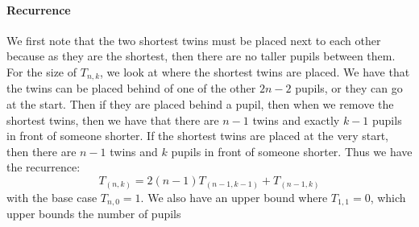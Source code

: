 \documentclass[]{article}
\begin{document}
\paragraph{Recurrence}
We first note that the two shortest twins must be placed next to each other because as they are the shortest, then there are no taller pupils between them. 
For the size of $T_{n, k}$, we look at where the shortest twins are placed. We have that the twins can be placed behind of one of the other $2n - 2$ pupils, or they can go at the start. Then if they are placed behind a pupil, then when we remove the shortest twins, then we have that there are $n-1$ twins and exactly $k-1$ pupils in front of someone shorter. If the shortest twins are placed at the very start, then there are $n-1$ twins and $k$ pupils in front of someone shorter. Thus we have the recurrence:
\begin{equation}
	T_{(n, k)} = 2(n-1) T_{(n-1, k-1)} + T_{(n-1, k)}
\end{equation}
with the base case $T_{n, 0} = 1$. We also have an upper bound where $T_{1, 1} = 0$, which upper bounds the number of pupils
\end{document}
